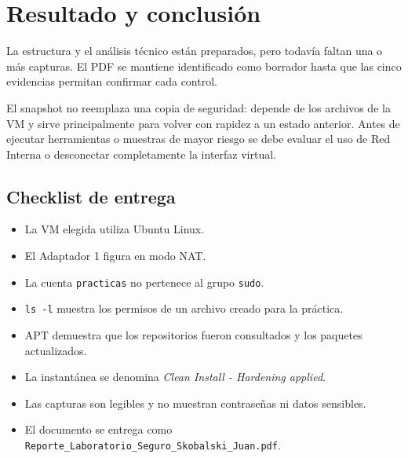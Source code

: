 \documentclass[11pt,a4paper]{article}
\newif\ifreportcomplete
\begin{document}
\newpage
\section*{Resultado y conclusión}

\ifreportcomplete
Las evidencias demuestran que la VM dispone de conectividad saliente controlada, una cuenta de práctica con permisos limitados, permisos de archivo verificables, paquetes actualizados y un punto de recuperación posterior al hardening. En conjunto, estos controles forman una base adecuada para ejercicios posteriores, siempre que el nivel de aislamiento se ajuste al riesgo de cada práctica.
\else
La estructura y el análisis técnico están preparados, pero todavía faltan una o más capturas. El PDF se mantiene identificado como borrador hasta que las cinco evidencias permitan confirmar cada control.
\fi

El snapshot no reemplaza una copia de seguridad: depende de los archivos de la VM y sirve principalmente para volver con rapidez a un estado anterior. Antes de ejecutar herramientas o muestras de mayor riesgo se debe evaluar el uso de Red Interna o desconectar completamente la interfaz virtual.

\subsection*{Checklist de entrega}

\begin{itemize}
  \item La VM elegida utiliza Ubuntu Linux.
  \item El Adaptador 1 figura en modo NAT.
  \item La cuenta \texttt{practicas} no pertenece al grupo \texttt{sudo}.
  \item \texttt{ls -l} muestra los permisos de un archivo creado para la práctica.
  \item APT demuestra que los repositorios fueron consultados y los paquetes actualizados.
  \item La instantánea se denomina \textit{Clean Install - Hardening applied}.
  \item Las capturas son legibles y no muestran contraseñas ni datos sensibles.
  \item El documento se entrega como \texttt{Reporte\_Laboratorio\_Seguro\_Skobalski\_Juan.pdf}.
\end{itemize}
\end{document}
